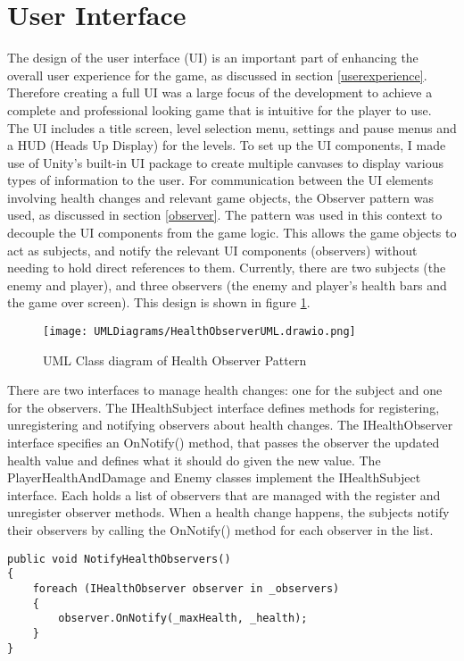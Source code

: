 \documentclass[10pt]{final_report}
\begin{document}
\section{User Interface}
The design of the user interface (UI) is an important part of enhancing the overall user experience for the game, as discussed in section \ref{userexperience}. Therefore creating a full UI was a large focus of the development to achieve a complete and professional looking game that is intuitive for the player to use. The UI includes a title screen, level selection menu, settings and pause menus and a HUD (Heads Up Display) for the levels.  \newline
To set up the UI components, I made use of Unity's built-in UI package \cite{unity2024_UI} to create multiple canvases to display various types of information to the user. 
For communication between the UI elements involving health changes and relevant game objects, the Observer pattern was used, as discussed in section \ref{observer}. The pattern was used in this context to decouple the UI components from the game logic. This allows the game objects to act as subjects, and notify the relevant UI components (observers) without needing to hold direct references to them. Currently, there are two subjects (the enemy and player), and three observers (the enemy and player's health bars and the game over screen). This design is shown in figure \ref{fig:label_observer1}.
\begin{figure}[H]
    \centering
    \texttt{[image: UMLDiagrams/HealthObserverUML.drawio.png]}
    \caption{UML Class diagram of Health Observer Pattern}
    \label{fig:label_observer1}
\end{figure}
There are two interfaces to manage health changes: one for the subject and one for the observers. The IHealthSubject interface defines methods for registering, unregistering and notifying observers about health changes. The IHealthObserver interface specifies an OnNotify() method, that passes the observer the updated health value and defines what it should do given the new value. 
The PlayerHealthAndDamage and Enemy classes implement the IHealthSubject interface. Each holds a list of observers that are managed with the register and unregister observer methods. When a health change happens, the subjects notify their observers by calling the OnNotify() method for each observer in the list.  
\begin{verbatim}
public void NotifyHealthObservers()
{
    foreach (IHealthObserver observer in _observers)
    {
        observer.OnNotify(_maxHealth, _health);
    }
}
\end{verbatim}
\end{document}
